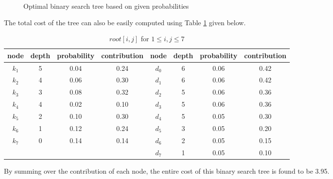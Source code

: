 \begin{figure}[H]\centering
{}
\caption{Optimal binary search tree based on given probabilities}\label{fig51}
\end{figure}

The total cost of the tree can also be easily computed using Table \ref{tab55} given below.

\begin{table}[H]\centering
\begin{tabular}{c c c c | c c c c}
node & depth & probability & contribution & node & depth & probability & contribution\\\hline
$k_1$ & 5 & 0.04 & 0.24 & $d_0$ & 6 & 0.06 & 0.42\\ 
$k_2$ & 4 & 0.06 & 0.30 & $d_1$ & 6 & 0.06 & 0.42\\ 
$k_3$ & 3 & 0.08 & 0.32 & $d_2$ & 5 & 0.06 & 0.36\\ 
$k_4$ & 4 & 0.02 & 0.10 & $d_3$ & 5 & 0.06 & 0.36\\ 
$k_5$ & 2 & 0.10 & 0.30 & $d_4$ & 5 & 0.05 & 0.30\\ 
$k_6$ & 1 & 0.12 & 0.24 & $d_5$ & 3 & 0.05 & 0.20\\ 
$k_7$ & 0 & 0.14 & 0.14 & $d_6$ & 2 & 0.05 & 0.15\\
      &   &      &      & $d_7$ & 1 & 0.05 & 0.10\\\hline
\end{tabular}
\caption{$root[i,j]$ for $1 \leq i,j \leq 7$}\label{tab55}
\end{table}

By summing over the contribution of each node, the entire cost of this binary search tree is found to be 3.95.
